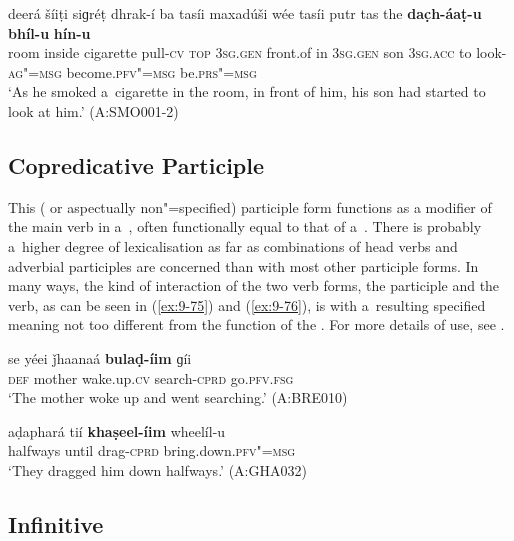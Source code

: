  
\begin{exe}
\ex
\label{ex:9-74}
\gll deerá šíiṭi siɡréṭ dhrak-í ba tasíi maxadúši wée tasíi putr tas the \textbf{dac̣h-áaṭ-u} \textbf{bhíl-u} \textbf{hín-u} \\
room inside cigarette pull-\textsc{cv} \textsc{top} \textsc{3sg.gen} front.of in \textsc{3sg.gen} son \textsc{3sg.acc} to look-\textsc{ag"=msg} become.\textsc{pfv"=msg} be.\textsc{prs"=msg } \\
\glt `As he smoked a~cigarette in the room, in front of him, his son had started to look at him.' (A:SMO001-2)
\end{exe}

\subsection{Copredicative Participle}
\label{subsec:9-3-5}

This ( or aspectually non"=specified) participle form functions as a modifier of the main verb in a~, often functionally equal to that of a~. There is probably a~higher degree of lexicalisation as far as combinations of head verbs and adverbial participles are concerned than with most other participle forms. In many ways, the kind of interaction of the two verb forms, the participle and the  verb, as can be seen in (\ref{ex:9-75}) and (\ref{ex:9-76}), is with a~resulting specified meaning not too different from the function of the . For more details of use, see . 

\begin{exe}
\ex
\label{ex:9-75}
\gll se yéei ǰhaanaá \textbf{bulaḍ-íim} ɡíi\\
\textsc{def} mother wake.up.\textsc{cv} search-\textsc{cprd} go.\textsc{pfv.fsg} \\
\glt `The mother woke up and went searching.' (A:BRE010)

\ex
\label{ex:9-76}
\gll aḍaphará tií \textbf{khaṣeel-íim} wheelíl-u\\
halfways until drag-\textsc{cprd} bring.down.\textsc{pfv"=msg} \\
\glt `They dragged him down halfways.' (A:GHA032)
\end{exe}

\subsection{Infinitive}
\label{subsec:9-3-6}

